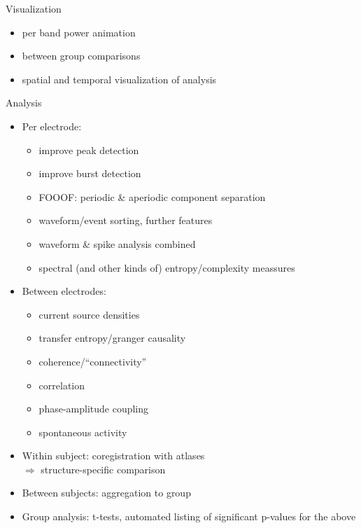 \documentclass[10pt]{beamer}
\begin{document}
\begin{frame}{Visualization}
 \begin{itemize}
  \item per band power animation \\ [2em]
  \item between group comparisons \\ [2em]
  \item spatial and temporal visualization of analysis
 \end{itemize}

\end{frame}


\begin{frame}[allowframebreaks]{Analysis}
  \begin{itemize}
   \item Per electrode:
  \begin{itemize}
      \item improve peak detection \\ 
      \item improve burst detection \\
      \item FOOOF: periodic \& aperiodic component separation \\
      \item waveform/event sorting, further features \\
      \item waveform \& spike analysis combined \\
      \item spectral (and other kinds of) entropy/complexity meassures \\ [1em]
  \end{itemize}
  \framebreak
  
  \item Between electrodes:
  \begin{itemize}
   \item current source densities \\
   \item transfer entropy/granger causality \\
   \item coherence/``connectivity'' \\
   \item correlation \\
   \item phase-amplitude coupling \\
   \item spontaneous activity
  \end{itemize}
  \framebreak

  \item Within subject: coregistration with atlases \\ $\Rightarrow$ structure-specific comparison
  \item Between subjects: aggregation to group
   \item Group analysis: t-tests, automated listing of significant p-values for the above
  \end{itemize}
\end{frame}
\end{document}
